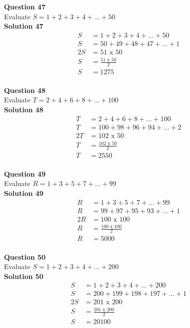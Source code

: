 \documentclass{article}
\begin{document}
\noindent\textbf{Question 47}\\[5pt]
Evaluate $S=1+2+3+4+...+50$\\[5pt]
\noindent\textbf{Solution 47}\\[5pt]
\begin{align*}
S&=1+2+3+4+...+50\\[2pt]
S&=50+49+48+47+...+1\\[2pt]
2S&=51\,\,\text{x}\,\,50\\[2pt]
S&=\displaystyle\frac{51\,\,\text{x}\,\,50}{2}\\[2pt]
S&=1275
\end{align*}\\[10pt]

\noindent\textbf{Question 48}\\[5pt]
Evaluate $T=2+4+6+8+...+100$\\[5pt]
\noindent\textbf{Solution 48}\\[5pt]
\begin{align*}
T&=2+4+6+8+...+100\\[2pt]
T&=100+98+96+94+...+2\\[2pt]
2T&=102\,\,\text{x}\,\,50\\[2pt]
T&=\displaystyle\frac{102\,\,\text{x}\,\,50}{2}\\[2pt]
T&=2550
\end{align*}\\[10pt]

\noindent\textbf{Question 49}\\[5pt]
Evaluate $R=1+3+5+7+...+99$\\[5pt]
\noindent\textbf{Solution 49}\\[5pt]
\begin{align*}
R&=1+3+5+7+...+99\\[2pt]
R&=99+97+95+93+...+1\\[2pt]
2R&=100\,\,\text{x}\,\,100\\[2pt]
R&=\displaystyle\frac{100\,\,\text{x}\,\,100}{2}\\[2pt]
R&=5000
\end{align*}\\[10pt]

\noindent\textbf{Question 50}\\[5pt]
Evaluate $S=1+2+3+4+...+200$\\[5pt]
\noindent\textbf{Solution 50}\\[5pt]
\begin{align*}
S&=1+2+3+4+...+200\\[2pt]
S&=200+199+198+197+...+1\\[2pt]
2S&=201\,\,\text{x}\,\,200\\[2pt]
S&=\displaystyle\frac{201\,\,\text{x}\,\,200}{2}\\[2pt]
S&=20100
\end{align*}\\[10pt]
\end{document}
